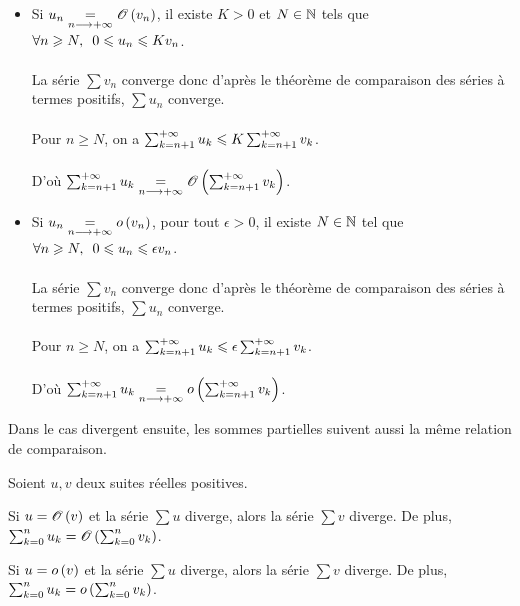 \begin{dem}
\begin{itemize}
    \item Si \(u_n\underset{n\longrightarrow+\infty}{=}\mathscr{O}\left(v_n\right)\), il existe \(K>0\) et \(N\in\mathbb{N}\) tels que \(\quantifs{\forall n\geq N}0\leq u_n\leq Kv_n\). \\\\ La série \(\sum v_n\) converge donc d'après le théorème de comparaison des séries à termes positifs, \(\sum u_n\) converge. \\\\ Pour \(n\geq N\), on a \(\sum_{k=n+1}^{+\infty}u_k\leqslant K\sum_{k=n+1}^{+\infty}v_k\). \\\\ D'où \(\sum_{k=n+1}^{+\infty}u_k\underset{n\longrightarrow+\infty}{=}\mathscr{O}\left(\sum_{k=n+1}^{+\infty}v_k\right)\). \\
    \item Si \(u_n\underset{n\longrightarrow+\infty}{=}o\left(v_n\right)\), pour tout \(\epsilon>0\), il existe \(N\in\mathbb{N}\) tel que \(\quantifs{\forall n\geq N}0\leq u_n\leq\epsilon v_n\). \\\\ La série \(\sum v_n\) converge donc d'après le théorème de comparaison des séries à termes positifs, \(\sum u_n\) converge. \\\\ Pour \(n\geq N\), on a \(\sum_{k=n+1}^{+\infty}u_k\leqslant\epsilon\sum_{k=n+1}^{+\infty}v_k\). \\\\ D'où \(\sum_{k=n+1}^{+\infty}u_k\underset{n\longrightarrow+\infty}{=}o\left(\sum_{k=n+1}^{+\infty}v_k\right)\).
\end{itemize}
\end{dem}

Dans le cas divergent ensuite, les sommes partielles suivent aussi la même relation de comparaison.

\begin{theo}
Soient \(u,v\) deux suites réelles positives.

Si \(u=\mathscr{O}\left(v\right)\) et la série \(\sum u\) diverge, alors la série \(\sum v\) diverge. De plus, \(\sum_{k=0}^nu_k=\mathscr{O}\left(\sum_{k=0}^nv_k\right)\).

Si \(u=o\left(v\right)\) et la série \(\sum u\) diverge, alors la série \(\sum v\) diverge. De plus, \(\sum_{k=0}^nu_k=o\left(\sum_{k=0}^nv_k\right)\).
\end{theo}

